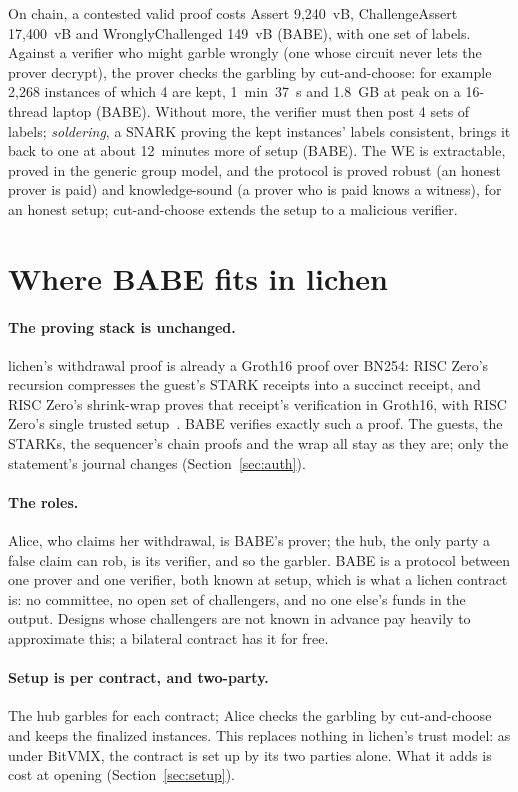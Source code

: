 \documentclass[11pt]{article}
\begin{document}
On chain, a contested valid proof costs Assert 9,240~vB, ChallengeAssert
17,400~vB and WronglyChallenged 149~vB (BABE), with one set of labels.
Against a verifier who might garble wrongly (one whose circuit never lets
the prover decrypt), the prover checks the garbling by cut-and-choose:
for example 2,268 instances of which 4 are kept, 1~min~37~s and 1.8~GB at
peak on a 16-thread laptop (BABE). Without more, the verifier must then
post 4 sets of labels; \emph{soldering}, a SNARK proving the kept
instances' labels consistent, brings it back to one at about 12~minutes
more of setup (BABE). The WE is extractable, proved in the generic group
model, and the protocol is proved robust (an honest prover is paid) and
knowledge-sound (a prover who is paid knows a witness), for an honest
setup; cut-and-choose extends the setup to a malicious verifier.

\section{Where BABE fits in lichen}
\label{sec:fit}

\paragraph{The proving stack is unchanged.} lichen's withdrawal proof is
already a Groth16 proof over BN254: RISC Zero's recursion compresses the
guest's STARK receipts into a succinct receipt, and RISC Zero's
shrink-wrap proves that receipt's verification in Groth16, with RISC
Zero's single trusted setup~\cite{risc0}. BABE verifies exactly such a
proof. The guests, the STARKs, the sequencer's chain proofs and the
wrap all stay as they are; only the statement's journal changes
(Section~\ref{sec:auth}).

\paragraph{The roles.} Alice, who claims her withdrawal, is BABE's
prover; the hub, the only party a false claim can rob, is its verifier,
and so the garbler. BABE is a protocol between one prover and one
verifier, both known at setup, which is what a lichen contract is: no
committee, no open set of challengers, and no one else's funds in the
output. Designs whose challengers are not known in advance pay heavily
to approximate this; a bilateral contract has it for free.

\paragraph{Setup is per contract, and two-party.} The hub garbles for
each contract; Alice checks the garbling by cut-and-choose and keeps the
finalized instances. This replaces nothing in lichen's trust model: as
under BitVMX, the contract is set up by its two parties alone. What it
adds is cost at opening (Section~\ref{sec:setup}).
\end{document}

